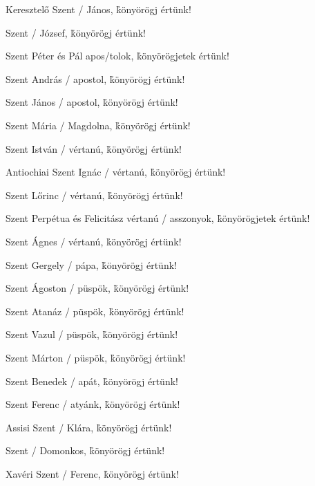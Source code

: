 \documentclass[twoside]{article}
\begin{document}

\e Keresztelő Szent / János,                          \hfill\h könyörögj értünk!

\e Szent / József,                                    \hfill\h könyörögj értünk!

\e Szent Péter és Pál apos/tolok,                     \hfill\h könyörögjetek értünk!

\e Szent András / apostol,                            \hfill\h könyörögj értünk!

\e Szent János / apostol,                             \hfill\h könyörögj értünk!

\e Szent Mária / Magdolna,                            \hfill\h könyörögj értünk!

\e Szent István / vértanú,                            \hfill\h könyörögj értünk!

\e Antiochiai Szent Ignác / vértanú,                  \hfill\h könyörögj értünk!

\e Szent Lőrinc / vértanú,                            \hfill\h könyörögj értünk!

\e Szent Perpétua és Felicitász vértanú / asszonyok,  \hfill\h könyörögjetek értünk!

\e Szent Ágnes / vértanú,                             \hfill\h könyörögj értünk!

\e Szent Gergely / pápa,                              \hfill\h könyörögj értünk!

\e Szent Ágoston / püspök,                            \hfill\h könyörögj értünk!

\e Szent Atanáz / püspök,                             \hfill\h könyörögj értünk!

\e Szent Vazul / püspök,                              \hfill\h könyörögj értünk!

\e Szent Márton / püspök,                             \hfill\h könyörögj értünk!

\e Szent Benedek / apát,                              \hfill\h könyörögj értünk!

\e Szent Ferenc / atyánk,                             \hfill\h könyörögj értünk!

\e Assisi Szent / Klára,                              \hfill\h könyörögj értünk!

\e Szent / Domonkos,                                  \hfill\h könyörögj értünk!

\e Xavéri Szent / Ferenc,                             \hfill\h könyörögj értünk!
\end{document}
